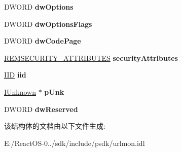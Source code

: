 \begin{DoxyCompactItemize}
\mbox{\label{struct_i_bind_status_callback_1_1__tag_rem_b_i_n_d_i_n_f_o_ab3db2ebf478ac6e01c372053b044a4b3}} 
D\+W\+O\+RD {\bfseries dw\+Options}
\item 
\mbox{\label{struct_i_bind_status_callback_1_1__tag_rem_b_i_n_d_i_n_f_o_ad9a10c21997b5e3e401fc734da78c887}} 
D\+W\+O\+RD {\bfseries dw\+Options\+Flags}
\item 
\mbox{\label{struct_i_bind_status_callback_1_1__tag_rem_b_i_n_d_i_n_f_o_a3da4c26921d70738d9d821ee8cf3f015}} 
D\+W\+O\+RD {\bfseries dw\+Code\+Page}
\item 
\mbox{\label{struct_i_bind_status_callback_1_1__tag_rem_b_i_n_d_i_n_f_o_ada17b64301968f0511719f29b9d09aeb}} 
\hyperlink{struct_i_bind_status_callback_1_1___r_e_m_s_e_c_u_r_i_t_y___a_t_t_r_i_b_u_t_e_s}{R\+E\+M\+S\+E\+C\+U\+R\+I\+T\+Y\+\_\+\+A\+T\+T\+R\+I\+B\+U\+T\+ES} {\bfseries security\+Attributes}
\item 
\mbox{\label{struct_i_bind_status_callback_1_1__tag_rem_b_i_n_d_i_n_f_o_a9160f061930981f72020835e0e3a080b}} 
\hyperlink{struct___i_i_d}{I\+ID} {\bfseries iid}
\item 
\mbox{\label{struct_i_bind_status_callback_1_1__tag_rem_b_i_n_d_i_n_f_o_adb1ebe3c2247be969f89f5a7d0587313}} 
\hyperlink{interface_i_unknown}{I\+Unknown} $\ast$ {\bfseries p\+Unk}
\item 
\mbox{\label{struct_i_bind_status_callback_1_1__tag_rem_b_i_n_d_i_n_f_o_ae3e899abc44f3b54766afcf4384a8f3f}} 
D\+W\+O\+RD {\bfseries dw\+Reserved}
\end{DoxyCompactItemize}


该结构体的文档由以下文件生成\+:\begin{DoxyCompactItemize}
\item 
E\+:/\+React\+O\+S-\/0../sdk/include/psdk/urlmon.\+idl\end{DoxyCompactItemize}
